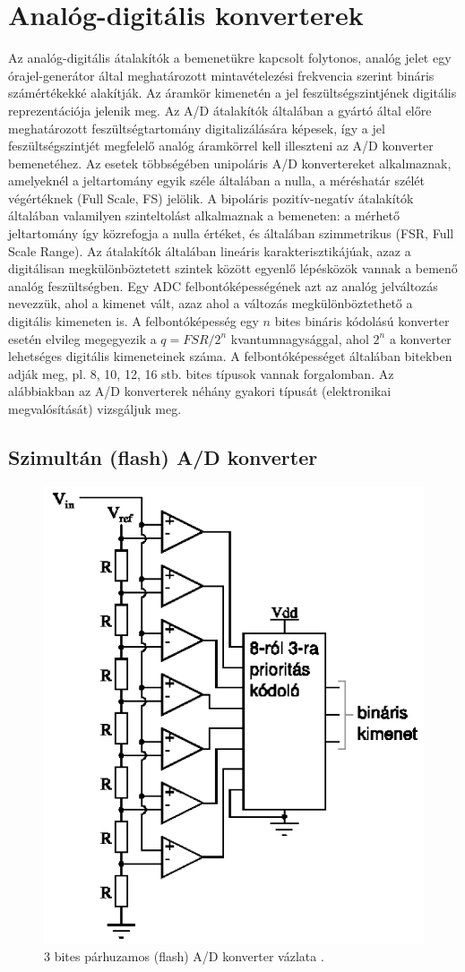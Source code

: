 \documentclass[12pt]{article}
\theoremstyle{plain}
\begin{document}
\section{Analóg-digitális konverterek}

Az analóg-digitális átalakítók a bemenetükre kapcsolt folytonos, analóg jelet egy órajel-generátor által meghatározott mintavételezési frekvencia szerint bináris számértékekké alakítják. Az áramkör kimenetén a jel feszültségszintjének digitális reprezentációja jelenik meg. Az A/D átalakítók általában a gyártó által előre meghatározott feszültségtartomány digitalizálására képesek, így a jel feszültségszintjét megfelelő analóg áramkörrel kell illeszteni az A/D konverter bemenetéhez. Az esetek többségében unipoláris A/D konvertereket alkalmaznak, amelyeknél a jeltartomány egyik széle általában a nulla, a méréshatár szélét végértéknek (Full Scale, FS) jelölik. A bipoláris pozitív-negatív átalakítók általában valamilyen szinteltolást alkalmaznak a bemeneten: a mérhető jeltartomány így közrefogja a nulla értéket, és általában szimmetrikus (FSR, Full Scale Range). Az átalakítók általában lineáris karakterisztikájúak, azaz a digitálisan megkülönböztetett szintek között egyenlő lépésközök vannak a bemenő analóg feszültségben. Egy ADC felbontóképességének azt az analóg jelváltozás nevezzük, ahol a kimenet vált, azaz ahol a változás megkülönböztethető a digitális kimeneten is. A felbontóképesség egy $n$ bites bináris kódolású konverter esetén elvileg megegyezik a $q = FSR/2^n$ kvantumnagysággal, ahol $2^n$ a konverter lehetséges digitális kimeneteinek száma. A felbontóképességet általában bitekben adják meg, pl. 8, 10, 12,
16 stb. bites típusok vannak forgalomban. Az alábbiakban az A/D konverterek néhány gyakori típusát (elektronikai megvalósítását) vizsgáljuk meg.


\subsection{Szimultán (flash) A/D konverter}

\begin{figure}[]
	\centering
	\includegraphics[width=0.5\linewidth]{media/ADC_flash}
	\caption{3 bites párhuzamos (flash) A/D konverter vázlata \cite{Bagoly}.}
	\label{fig:adcflash}
\end{figure}
\end{document}

